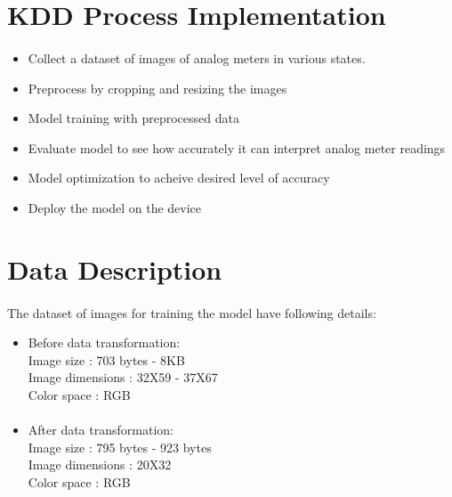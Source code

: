 \section{KDD Process Implementation}

\STANDARD{\insertsection}
{ 
	
	\framesubtitle{\insertsubsection}
	\begin{itemize}
		\item Collect a dataset of images of analog meters in various states. 
		\item Preprocess by cropping and resizing the images
		\item Model training with preprocessed data
		\item Evaluate model to see how accurately it can interpret analog meter readings
		\item Model optimization to acheive desired level of accuracy
		\item Deploy the model on the device
	\end{itemize}
	
}


\section{Data Description}

\STANDARD{\insertsection}
{ 
	
	\framesubtitle{\insertsubsection}
	The dataset of images for training the model have following details:\\
	
	\begin{itemize}
		\item Before data transformation:\\
		Image size : 703 bytes - 8KB\\
		Image dimensions : 32X59 - 37X67\\
		Color space : RGB
	\end{itemize}
	
	\framesubtitle{\insertsubsection}
	\begin{itemize}
		\item After data transformation:\\
		Image size : 795 bytes - 923 bytes\\
		Image dimensions : 20X32\\
		Color space : RGB
	\end{itemize}
	

	
	
}


